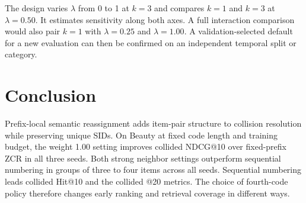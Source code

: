 \documentclass[10pt,twocolumn,letterpaper]{article}
\begin{document}
The design varies $\lambda$ from 0 to 1 at $k=3$ and compares $k=1$ and $k=3$ at $\lambda=0.50$.
It estimates sensitivity along both axes.
A full interaction comparison would also pair $k=1$ with $\lambda=0.25$ and $\lambda=1.00$.
A validation-selected default for a new evaluation can then be confirmed on an independent temporal split or category.

\section{Conclusion}
Prefix-local semantic reassignment adds item-pair structure to collision resolution while preserving unique SIDs.
On Beauty at fixed code length and training budget, the weight 1.00 setting improves collided NDCG@10 over fixed-prefix ZCR in all three seeds.
Both strong neighbor settings outperform sequential numbering in groups of three to four items across all seeds.
Sequential numbering leads collided Hit@10 and the collided @20 metrics.
The choice of fourth-code policy therefore changes early ranking and retrieval coverage in different ways.



\end{document}
